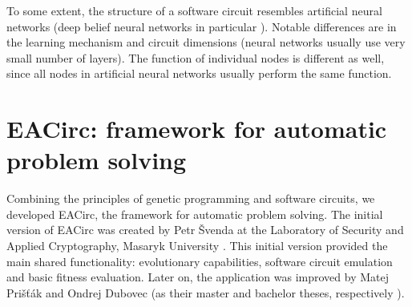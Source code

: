 \documentclass[12pt,oneside]{fithesis2}
\begin{document}
To some extent, the structure of a software circuit resembles artificial neural networks 
(deep belief neural networks in particular \parencite{neural-networks}). Notable differences are in
the learning mechanism and circuit dimensions (neural networks usually use very small number of layers). 
The function of individual nodes is different as well, since all nodes in artificial neural networks usually perform the same function.

\section{EACirc: framework for automatic problem solving}
\label{sec:eacirc-principles}

Combining the principles of genetic programming and software circuits, we developed EACirc, the framework for automatic
problem solving. The initial version of EACirc was created by Petr Švenda at 
the Laboratory of Security and Applied Cryptography, Masaryk University \parencite{labak}.
This initial version provided the main shared functionality: evolutionary capabilities, software circuit emulation
and basic fitness evaluation. Later on, the application was improved by Matej Prišťák and Ondrej Dubovec 
(as their master and bachelor theses, respectively \parencite{thesis-pristak, thesis-dubovec}).
\end{document}

